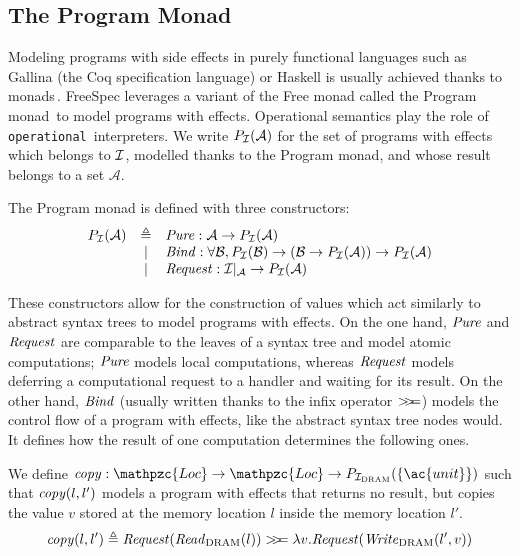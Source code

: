 \subsection{The Program Monad}

Modeling programs with side effects in purely functional languages such as
{\textsc Gallina} (the Coq specification language) or Haskell is usually
achieved thanks to monads\,\cite{hoareetal2001monad}.
%
FreeSpec leverages a variant of the Free monad called the Program
monad\,\cite{operational} to model programs with effects. Operational semantics
play the role of \texttt{operational}\,\cite{operational} interpreters.
%
We write $P_{\mathcal{I}}(\mathcal{A})$ for the set of programs with effects which
belongs to $\mathcal{I}$, modelled thanks to the Program monad, and whose result belongs
to a set $\mathcal{A}$.

\begin{definition}
  The Program monad is defined with three constructors:
  \[
    \begin{array}{rcl}
      P_{\mathcal{I}}(\mathcal{A})
      & \triangleq
      & \mathit{Pure} : \mathcal{A} \rightarrow P_{\mathcal{I}}(\mathcal{A}) \\

      & |
      & \mathit{Bind} : \forall \mathcal{B}, P_{\mathcal{I}}(\mathcal{B}) \rightarrow
        (\mathcal{B} \rightarrow P_{\mathcal{I}}(\mathcal{A})) \rightarrow
        P_{\mathcal{I}}(\mathcal{A}) \\

      & |
      & \mathit{Request} : \mathcal{I}|_{\mathcal{A}} \rightarrow
        P_{\mathcal{I}}(\mathcal{A})
    \end{array}
  \]
\end{definition}
%
These constructors allow for the construction of values which act similarly to
abstract syntax trees to model programs with effects.
%
On the one hand, $\mathit{Pure}$ and $\mathit{Request}$ are comparable to the leaves
of a syntax tree and model atomic computations; $\mathit{Pure}$ models local
computations, whereas $\mathit{Request}$ models deferring a computational request
to a handler and waiting for its result.
%
On the other hand, $\mathit{Bind}$ (usually written thanks to the infix operator
$>\!\!>\!\!=$) models the control flow of a program with effects, like the abstract
syntax tree nodes would.
%
It defines how the result of one computation determines the following ones.

\begin{example}[Copy]
  We define
  $\func{copy} : \mathpzc{Loc} \rightarrow \mathpzc{Loc} \rightarrow
  P_{\I_{\mathrm{DRAM}}}(\{\ac{unit}\})$ such that $\mathit{copy}(l, l')$ models a
  program with effects that returns no result, but copies the value $v$ stored
  at the memory location $l$ inside the memory location $l'$.
  \[ \mathit{copy}(l, l') \triangleq
    \mathit{Request}(\mathit{Read}_{\mathrm{DRAM}}(l)) >\!\!>\!\!= \lambda
    v. \mathit{Request}(\mathit{Write}_{\mathrm{DRAM}}(l', v))
  \]
\end{example}

